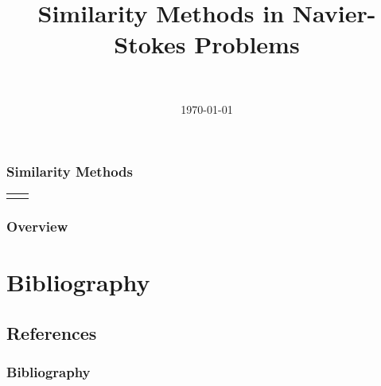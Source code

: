 \documentclass[]{beamer}
\title
[Similarity Methods in Navier-Stokes Problems]
{Similarity Methods in Navier-Stokes Problems}
\author[DTRIAC Tutorial]{\Topa \\ \TopaEmail}
\institute{\dtriac}
\date{\today}
\numberwithin{equation}{subsection}
\numberwithin{theorem}{subsection}
\begin{document}
\begin{frame}
	\titlepage
\end{frame}

\begin{frame}\frametitle{Similarity Methods}
\begin{table}[htp]
\begin{center}
	\begin{tabular}{cc}
	\href{https://pubs.aip.org/physicstoday/article-abstract/64/9/42/413713/Dynamic-similarity-the-dimensionless}{
	\begin{overpic}[ scale = 0.45 ]
		{\pLocalGraphics pt-dynamic-similarity}
	\end{overpic}}
	\end{tabular}
\end{center}
\end{table}%
\end{frame}

\begin{frame}\frametitle{Overview}
	\tableofcontents[hideallsubsections]
\end{frame}

	
	

\section{Bibliography}
\subsection{References}
\begin{frame}[t,allowframebreaks]
\frametitle{Bibliography}
\printbibliography[heading=none]
\end{frame}
\end{document}
